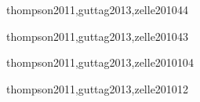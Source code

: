 \begin{syllabus}
\begin{unit}{\ALFundamentalAlgorithmsDef}{thompson2011,guttag2013,zelle2010}{4}{4}
    \begin{topics}%
	\item \ALFundamentalAlgorithmsTopicSimple%
	\item \ALFundamentalAlgorithmsTopicSequential%
	\item \ALFundamentalAlgorithmsTopicQuadratic%
	\item \ALFundamentalAlgorithmsTopicBinary%
	\item \ALFundamentalAlgorithmsTopicDepth%
    \end{topics}%
    \ALFundamentalAlgorithmsAllObjectives
\end{unit}

\begin{unit}{\PLAbstractionMechanismsDef}{thompson2011,guttag2013,zelle2010}{4}{3}
   \begin{topics}
      \item \PLAbstractionMechanismsTopicProcedures%
      \item \PLAbstractionMechanismsTopicParameterization%
      \item \PLAbstractionMechanismsTopicType%
      \item \PLAbstractionMechanismsTopicModules%
   \end{topics}
   \begin{unitgoals}
      \item \PLAbstractionMechanismsObjONE%
      \item \PLAbstractionMechanismsObjTWO%
      \item \PLAbstractionMechanismsObjTHREE%
   \end{unitgoals}
\end{unit}

\begin{unit}{\PFAlgorithmsAndProblemSolvingDef}{thompson2011,guttag2013,zelle2010}{10}{4}
    \PFAlgorithmsAndProblemSolvingAllTopics
    \PFAlgorithmsAndProblemSolvingAllObjectives
\end{unit}

\begin{unit}{\PLVirtualMachinesDef}{thompson2011,guttag2013,zelle2010}{1}{2}
   \begin{topics}
      \item \PLVirtualMachinesTopicETheconcept
   \end{topics}
   \begin{unitgoals}
      \item \PLVirtualMachinesObjONE
   \end{unitgoals}
\end{unit}


\end{syllabus}
